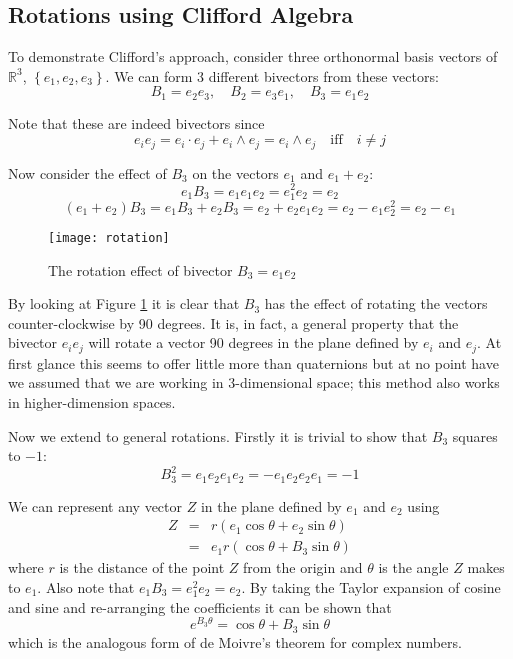 \subsection{Rotations using Clifford Algebra}

To demonstrate Clifford's approach, consider three orthonormal basis
vectors of $\mathbb{R}^3$, $\left\{e_1, e_2, e_3\right\}$. We can form
3 different bivectors from these vectors:
\begin{displaymath}
B_1 = e_2e_3,\quad B_2 = e_3e_1,\quad B_3 = e_1e_2
\end{displaymath}

Note that these are indeed bivectors since
\[
e_ie_j = e_i \cdot e_j + e_i \wedge e_j = e_i \wedge e_j \quad \mbox{iff} \quad i \ne j
\]

Now consider the effect of $B_3$ on the vectors $e_1$ and $e_1 + e_2$:
\begin{displaymath}
e_1B_3 = e_1e_1e_2 = e_1^2e_2=e_2 
\end{displaymath}
\begin{displaymath}
(e_1 + e_2)B_3 = e_1B_3 + e_2B_3 = e_2 + e_2e_1e_2 = e_2 - e_1e_2^2 = e_2 - e_1
\end{displaymath}

\begin{figure}
\centering
\texttt{[image: rotation]}
\caption{The rotation effect of bivector $B_3 = e_1e_2$\label{fig:rotation}}
\end{figure}

By looking at Figure \ref{fig:rotation} it is clear that $B_3$ has the
effect of rotating the vectors counter-clockwise by 90 degrees. It is, in
fact, a general property that the bivector $e_ie_j$ will rotate a
vector 90 degrees in the plane defined by $e_i$ and $e_j$. At first 
glance this seems to offer little more than quaternions but at no point 
have we assumed that we are working in 3-dimensional space; this method
also works in higher-dimension spaces.

Now we extend to general rotations. Firstly it is trivial to
show that $B_3$ squares to $-1$:
\begin{displaymath}
B_3^2 = e_1e_2e_1e_2 = -e_1e_2e_2e_1 = -1
\end{displaymath}

We can represent any vector $Z$ in the plane defined by $e_1$ and
$e_2$ using
\begin{eqnarray*}
Z & = & r ( e_1 \cos \theta + e_2 \sin \theta) \\
  & = & e_1 r ( \cos \theta + B_3 \sin \theta)
\end{eqnarray*}
where $r$ is the distance of the point $Z$ from the origin
and $\theta$ is the angle $Z$ makes to $e_1$. Also note
that $e_1B_3 = e_1^2e_2 = e_2$. By taking the Taylor expansion of cosine
and sine and re-arranging the coefficients it can be shown that
\[
e^{B_3\theta} = \cos \theta + B_3 \sin \theta
\]
which is the analogous form of de Moivre's theorem for complex
numbers.

